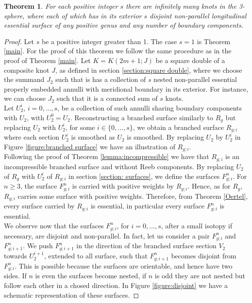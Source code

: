 \documentclass[reqno]{amsart}
\newtheorem{thm}{Theorem}
\theoremstyle{definition}
\theoremstyle{remark}
\begin{document}
\begin{thm}\label{theorem:disjoint}
For each positive integer $s$ there are infinitely many knots in the 3-sphere,  where each of which has in its exterior $s$ disjoint non-parallel longitudinal essential surface of any positive genus and any number of boundary components. 
\end{thm}
\begin{proof}
Let $s$ be a positive integer greater than 1. The case $s=1$ is Theorem \ref{main}. For the proof of this theorem we follow the same procedure as in the proof of Theorem \ref{main}.  Let $K=K(2m+1; J)$ be a square double of a composite knot $J$,  as defined in section \ref{section:square double}, where we choose the summand $J_2$ such that is has a collection of $s$ nested non-parallel essential properly embedded annulli with meridional boundary in its exterior.  For instance, we can choose $J_2$ such that it is a connected sum of $s$ knots.\\
Let $U_2^i$, $i=0, \ldots, s$, be a collection of such annulli sharing boundary components with $U_2$, with $U_2^0=U_2$. Reconstructing a branched surface similarly to $R_g$ but replacing $U_2$ with $U_2^i$, for some  $i\in \{0, \ldots, s\}$, we obtain a branched surface $R_{g;i}$ where each section $U_2^i$ is smoothed as $U_2$ is smoothed. By replacing $U_2$ by $U_2^i$ in Figure \ref*{figure:branched surface} we have an illustration of $R_{g;i}$.\\
Following the proof of Theorem \ref{lemma:incompressible} we have that $R_{g;i}$ is an incompressible branched surface and without Reeb components. By replacing $U_2$ of $R_g$ with $U_2^i$ of $R_{g;i}$ in section \ref{section: surfaces}, we define the surfaces $F_{g;i}^n$. For $n\geq 3$, the surface $F_{g;i}^n$ is carried with positive weights by $R_{g;i}$. Hence, as for $R_g$, $R_{g;i}$ carries some surface with positive weights. Therefore, from Theorem \ref*{Oertel}, every surface carried by $R_{g;i}$ is essential, in particular every surface $F_{g;i}^n$ is essential.\\
We observe now that the surfaces $F_{g;i}^n$, for $i=0, \ldots , s$, after a small isotopy if necessary, are disjoint and  non-parallel. In fact, let us consider a pair $F_{g;i}^n$ and $F_{g;i+1}^n$. We push $F_{g;i+1}^n$ in the direction of the branched surface section $V_2$ towards $U_2^{i+1}$, extended to all surface,  such that $F_{g;i+1}^n$ becomes disjoint from $F_{g;i}^n$. This is possible because the surfaces are orientable, and hence have two sides. If $n$ is even the surfaces become nested, if $n$ is odd they are not nested but follow each other in a chosed direction. In Figure \ref{figure:disjoint} we have a schematic representation of these surfaces.


\end{proof}
\end{document}
